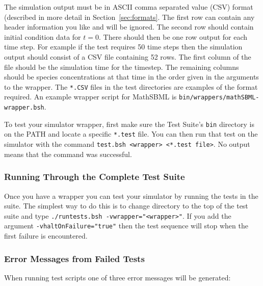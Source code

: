 \documentclass{cekarticle}
\begin{document}
The simulation output must be in ASCII comma separated value (CSV)
format (described in more detail in Section~\ref{sec:formats}. The
first row can contain any header information you like and will be
ignored. The second row should contain initial condition data for
$t=0$. There should then be one row output for each time step. For
example if the test requires 50 time steps then the simulation
output should consist of a CSV file containing 52 rows.  The first
column of the file should be the simulation time for the timestep.
The remaining columns should be species concentrations at that
time in the order given in the arguments to the wrapper. The
\texttt{*.CSV} files in the test directories are examples of the
format required.  An example wrapper script for MathSBML is
\texttt{bin/wrappers/mathSBML-wrapper.bsh}.

To test your simulator wrapper, first make sure the Test Suite's \texttt{bin}
directory is on the PATH and locate a specific \texttt{*.test}
file.  You can then run that test on the simulator with the
command \texttt{test.bsh <wrapper> <*.test file>}.  No output
means that the command was successful.

\subsubsection{Running Through the Complete Test Suite}
Once you have a wrapper you can test your simulator by running the
tests in the suite.  The simplest way to do this is to change
directory to the top of the test suite and type
\texttt{./runtests.bsh -vwrapper="<wrapper>"}. If you add the
argument \texttt{-vhaltOnFailure="true"} then the test sequence
will stop when the first failure is encountered.

\subsubsection{Error Messages from Failed Tests}
When running test scripts one of three error messages will be
generated:
\end{document}
